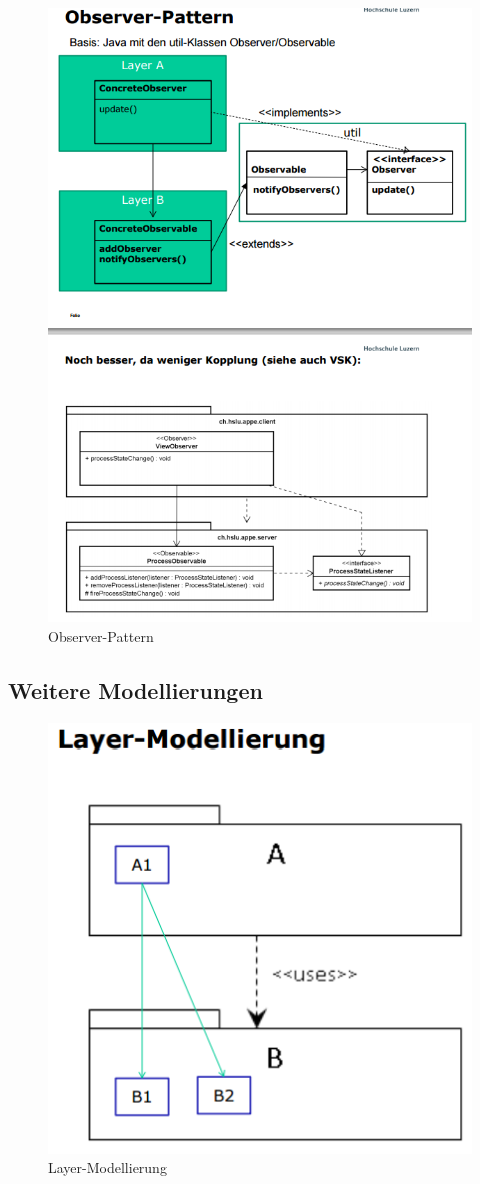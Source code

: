 \begin{figure}[h!]
\centering
\includegraphics[width=0.7\linewidth]{fig/observer-pattern}
\caption{Observer-Pattern}
\label{fig:observer-pattern}
\end{figure}

\subsection{Weitere Modellierungen}
\begin{figure}[h!]
\centering
\includegraphics[width=0.7\linewidth]{fig/layer-modellierung}
\caption{Layer-Modellierung}
\label{fig:layer-modellierung}
\end{figure}

